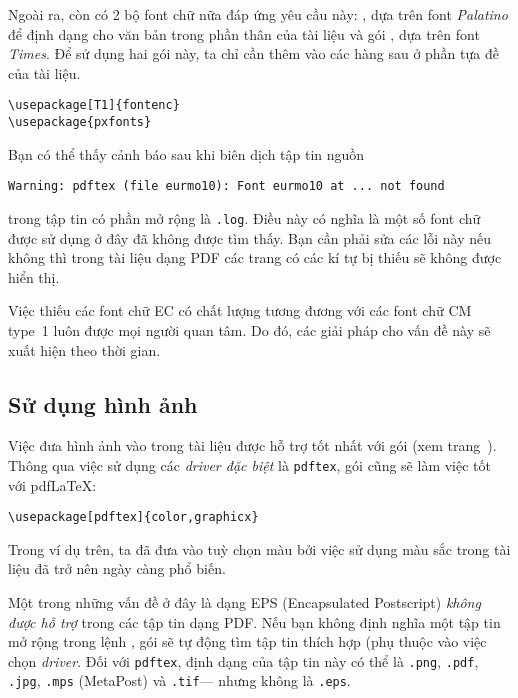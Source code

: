 Ngoài ra, còn có 2 bộ font chữ nữa đáp ứng yêu cầu này: , dựa trên font \emph{Palatino} để định dạng cho văn
bản trong phần thân của tài liệu và gói , dựa trên font \emph{Times}. Để sử dụng hai gói này, ta chỉ cần thêm vào các hàng sau ở phần tựa đề của tài liệu.
\begin{code}
\begin{verbatim}
\usepackage[T1]{fontenc}
\usepackage{pxfonts}
\end{verbatim}
\end{code}

Bạn có thể thấy cảnh báo sau khi biên dịch tập tin nguồn
\begin{verbatim}
Warning: pdftex (file eurmo10): Font eurmo10 at ... not found
\end{verbatim}
\noindent trong tập tin có phần mở rộng là \texttt{.log}. Điều này có nghĩa là một số font chữ được sử dụng ở đây đã không được tìm thấy. Bạn cần phải sửa các lỗi này nếu không thì trong tài liệu dạng PDF các trang có các kí tự bị thiếu sẽ không được hiển thị.

Việc thiếu các font chữ EC có chất lượng tương đương với các font chữ CM type~1 luôn được mọi người quan tâm. Do đó, các giải pháp cho vấn đề này sẽ xuất hiện theo thời gian.

\subsection{Sử dụng hình ảnh}
\label{ssec:pdfgraph} Việc đưa hình ảnh vào trong tài liệu được hỗ trợ tốt nhất với gói  (xem trang~\pageref{eps}). Thông qua việc sử dụng các \emph{driver đặc biệt} là \texttt{pdftex}, gói  cũng sẽ làm việc tốt với pdf\LaTeX{}:

\begin{code}
\begin{verbatim}
\usepackage[pdftex]{color,graphicx}
\end{verbatim}
\end{code}
Trong ví dụ trên, ta đã đưa vào tuỳ chọn màu bởi việc sử dụng màu sắc trong tài liệu đã trở nên ngày càng phổ biến.

Một trong những vấn đề ở đây là dạng EPS (Encapsulated Postscript) \emph{không được hỗ trợ} trong các tập tin dạng PDF. Nếu bạn không định nghĩa một tập tin mở rộng trong lệnh , gói  sẽ tự động tìm tập tin thích hợp (phụ thuộc vào việc chọn \emph{driver}. Đối với \texttt{pdftex}, định dạng của tập tin này có thể là \texttt{.png}, \texttt{.pdf}, \texttt{.jpg}, \texttt{.mps} (MetaPost) và \texttt{.tif}--- nhưng không là \texttt{.eps}.

